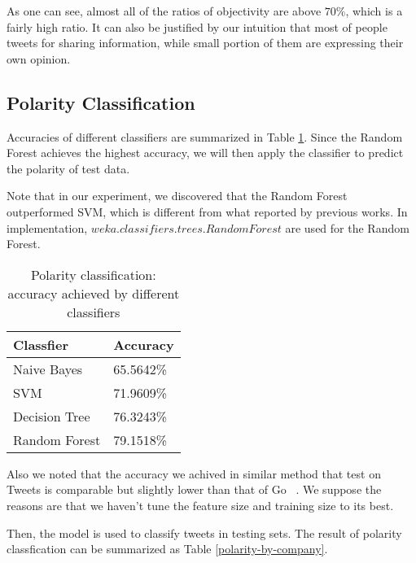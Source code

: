 \documentclass[12pt]{article}
\begin{document}
As one can see, almost all of the ratios of objectivity are above $70\%$, which is a fairly high ratio. It can also be justified by our intuition that most of people tweets for sharing information, while small portion of them are expressing their own opinion.

\subsection{Polarity Classification}
Accuracies of different classifiers are summarized in Table \ref{classifiers-polarity}. Since the Random Forest achieves the highest accuracy, we will then apply the classifier to predict the polarity of test data.

Note that in our experiment, we discovered that the Random Forest outperformed SVM, which is different from what reported by previous works. In implementation, $weka.classifiers.trees.RandomForest$ are used for the Random Forest.

\begin{table}
\begin{center}
    \begin{tabular}{ | l || l | }
        \hline
        \textbf{Classfier} &  \textbf{Accuracy} \\ \hline
        \hline
        Naive Bayes &  65.5642\% \\ \hline
        SVM & 71.9609\% \\ \hline
        Decision Tree & 76.3243\% \\ \hline
        Random Forest & 79.1518\% \\ \hline
    \end{tabular}
\caption{Polarity classification: accuracy achieved by different classifiers}
\label{classifiers-polarity}
\end{center}
\end{table}

Also we noted that the accuracy we achived in similar method that test on Tweets is comparable but slightly lower than that of Go \etal~\cite{Go:09}. We suppose the reasons are that we haven't tune the feature size and training size to its best.

Then, the model is used to classify tweets in testing sets. The result of polarity classfication can be summarized as Table \ref{polarity-by-company}.
\end{document}

